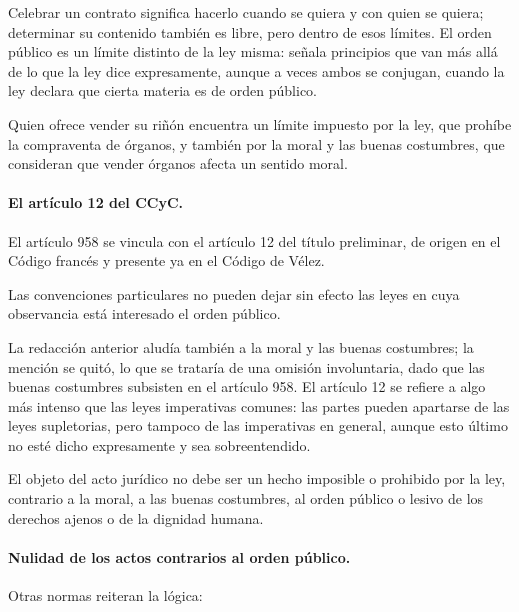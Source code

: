 \documentclass[12pt,oneside]{book}
\begin{document}
Celebrar un contrato significa hacerlo cuando se quiera y con quien se quiera; determinar su contenido también es libre, pero dentro de esos límites. El orden público es un límite distinto de la ley misma: señala principios que van más allá de lo que la ley dice expresamente, aunque a veces ambos se conjugan, cuando la ley declara que cierta materia es de orden público.

\begin{ejemplo}
Quien ofrece vender su riñón encuentra un límite impuesto por la ley, que prohíbe la compraventa de órganos, y también por la moral y las buenas costumbres, que consideran que vender órganos afecta un sentido moral.
\end{ejemplo}

\paragraph{El artículo 12 del CCyC.} El artículo 958 se vincula con el artículo 12 del título preliminar, de origen en el Código francés y presente ya en el Código de Vélez.

\begin{regla}
Las convenciones particulares no pueden dejar sin efecto las leyes en cuya observancia está interesado el orden público.
\end{regla}

La redacción anterior aludía también a la moral y las buenas costumbres; la mención se quitó, lo que se trataría de una omisión involuntaria, dado que las buenas costumbres subsisten en el artículo 958. El artículo 12 se refiere a algo más intenso que las leyes imperativas comunes: las partes pueden apartarse de las leyes supletorias, pero tampoco de las imperativas en general, aunque esto último no esté dicho expresamente y sea sobreentendido.

\begin{regla}
El objeto del acto jurídico no debe ser un hecho imposible o prohibido por la ley, contrario a la moral, a las buenas costumbres, al orden público o lesivo de los derechos ajenos o de la dignidad humana.
\end{regla}

\paragraph{Nulidad de los actos contrarios al orden público.} Otras normas reiteran la lógica:
\end{document}
